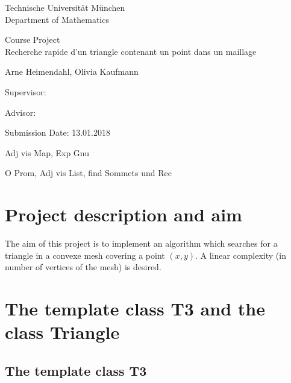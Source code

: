 \documentclass[10pt]{article}
\begin{document}
	
\begin{titlepage}
	\begin{center}
		{\Large
			Technische Universit\"at M\"unchen\\[5mm]
			Department of Mathematics\\[8mm]
		}
		\normalsize
		
		Course Project\\[15mm]
		
		{\Huge
			Recherche rapide d’un triangle contenant un point dans un maillage
		}
		\bigskip
		
		\normalsize
		
		Arne Heimendahl, Olivia Kaufmann
	\end{center}
	\vspace*{75mm}
	
	Supervisor: 
	\medskip
	
	Advisor: 
	\medskip
	
	Submission Date: 13.01.2018 
	
\end{titlepage}

\newpage
\tableofcontents
\newpage

	

Adj vis Map, Exp Gnu

O Prom, Adj vis List, find Sommets und Rec

\section{Project description and aim}

The aim of this project is to implement an algorithm which searches for a triangle in a convexe mesh covering a point $(x,y)$. A linear complexity (in number of vertices of the mesh) is desired.

\section{The template class T3 and the class Triangle}

\subsection{The template class T3} \label{T3}
\end{document}
